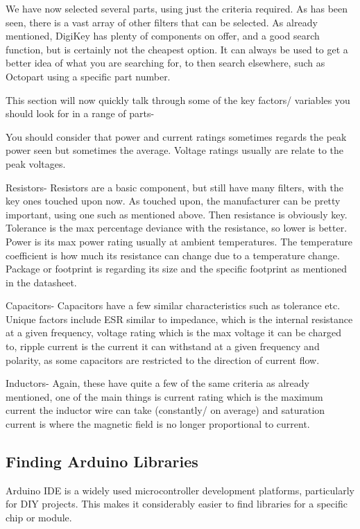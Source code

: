 \documentclass[a4paper,11pt]{report}
\begin{document}
We have now selected several parts, using just the criteria required. As has been seen, there is a vast array of other filters that can be selected. As already mentioned, DigiKey has plenty of components on offer, and a good search function, but is certainly not the cheapest option. It can always be used to get a better idea of what you are searching for, to then search elsewhere, such as Octopart using a specific part number.

This section will now quickly talk through some of the key factors/ variables you should look for in a range of parts-

You should consider that power and current ratings sometimes regards the peak power seen but sometimes the average. Voltage ratings usually are relate to the peak voltages.

Resistors- Resistors are a basic component, but still have many filters, with the key ones touched upon now. As touched upon, the manufacturer can be pretty important, using one such as mentioned above. Then resistance is obviously key. Tolerance is the max percentage deviance with the resistance, so lower is better. Power is its max power rating usually at ambient temperatures. The temperature coefficient is how much its resistance can change due to a temperature change. Package or footprint is regarding its size and the specific footprint as mentioned in the datasheet.

Capacitors- Capacitors have a few similar characteristics such as tolerance etc. Unique factors include ESR similar to impedance, which is the internal resistance at a given frequency, voltage rating which is the max voltage it can be charged to, ripple current is the current it can withstand at a given frequency and polarity, as some capacitors are restricted to the direction of current flow.

Inductors- Again, these have quite a few of the same criteria as already mentioned, one of the main things is current rating which is the maximum current the inductor wire can take (constantly/ on average) and saturation current is where the magnetic field is no longer proportional to current.

\subsection{Finding Arduino Libraries}

Arduino IDE is a widely used microcontroller development platforms, particularly for DIY projects. This makes it considerably easier to find libraries for a specific chip or module.
\end{document}
